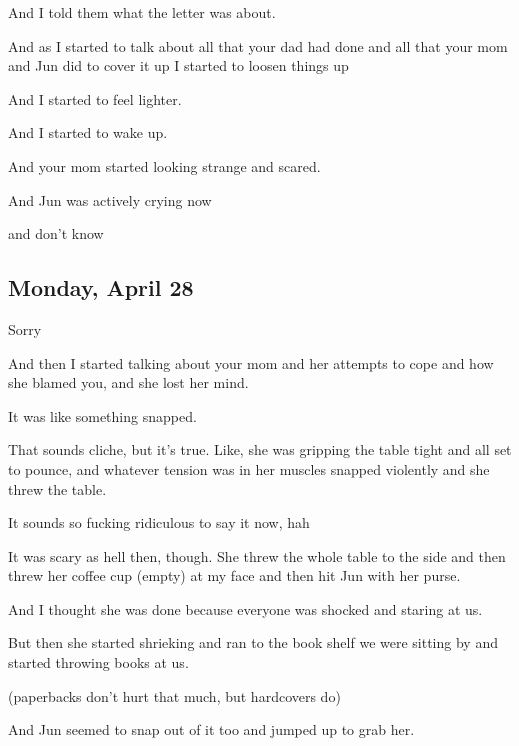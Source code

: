 { And I told them what the letter was about.

 And as I started to talk about all that your dad had done and all that your mom and Jun did to cover it up I started to loosen things up

 And I started to feel lighter.

 And I started to wake up.

 And your mom started looking strange and scared.

 And Jun was actively crying now

 and don't know

\newpage

\subsection*{Monday, April 28}\label{monday-april-28}

 Sorry

 And then I started talking about your mom and her attempts to cope and how she blamed you, and she lost her mind.

 It was like something snapped.

 That sounds cliche, but it's true. Like, she was gripping the table tight and all set to pounce, and whatever tension was in her muscles snapped violently and she threw the table.

 It sounds so fucking ridiculous to say it now, hah

 It was scary as hell then, though. She threw the whole table to the side and then threw her coffee cup
(empty) at my face and then hit Jun with her purse.

 And I thought she was done because everyone was shocked and staring at us.

 But then she started shrieking and ran to the book shelf we were sitting by and started throwing books at us.

(paperbacks don't hurt that much, but hardcovers do)

 And Jun seemed to snap out of it too and jumped up to grab her.

}
